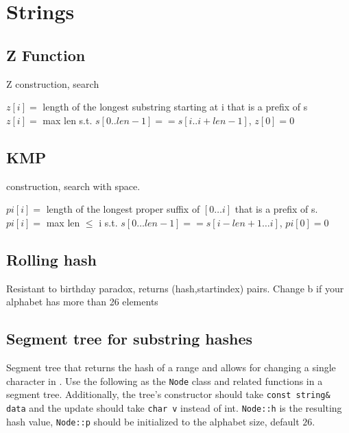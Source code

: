 \section{Strings}

\subsection{Z Function}
 Z construction,  search

\begin{flushleft}
$z[i] = $ length of the longest substring starting at i that is a prefix of s \\
$z[i] = $ max len s.t. $s[0..len-1] == s[i..i+len-1]$, $z[0] = 0$

\end{flushleft}


\subsection{KMP}
 construction,  search with  space.

$pi[i] =$ length of the longest proper suffix of $[0 \ldots i]$ that is a prefix of s. \\
$pi[i] =$ max len $\leq$ i s.t. $s[0\ldots len-1] == s[i-len+1 \ldots i]$, $pi[0]=0$


\subsection{Rolling hash}
Resistant to birthday paradox, returns (hash,startindex) pairs. Change b if your alphabet has more than 26 elements


\subsection{Segment tree for substring hashes}

Segment tree that returns the hash of a range and allows for changing a single character in . Use the following as the \verb|Node| class and related functions in a segment tree. Additionally, the tree's constructor should take \verb|const string& data| and the update should take \verb|char v| instead of int. \verb|Node::h| is the resulting hash value, \verb|Node::p| should be initialized to the alphabet size, default $26$.



